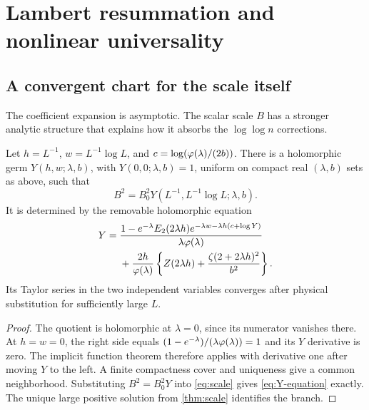 \section{Lambert resummation and nonlinear universality}
\label{sec:universality}

\subsection{A convergent chart for the scale itself}

The coefficient expansion is asymptotic. The scalar scale $B$ has a
stronger analytic structure that explains how it absorbs the
$\log\log n$ corrections.

\begin{proposition}
\label{prop:scale-chart}
Let $h=L^{-1}$, $w=L^{-1}\log L$, and
$c=\log(\varphi(\lambda)/(2b))$. There is a holomorphic germ
$Y(h,w;\lambda,b)$, with $Y(0,0;\lambda,b)=1$, uniform on compact
real $(\lambda,b)$ sets as above, such that
\begin{equation}\label{eq:Y-scale}
 B^2=B_0^2Y(L^{-1},L^{-1}\log L;\lambda,b).
\end{equation}
It is determined by the removable holomorphic equation
\begin{equation}\label{eq:Y-equation}
\begin{split}
 Y={}&\frac{1-e^{-\lambda}E_2(2\lambda h)
                e^{-\lambda w-\lambda h(c+\log Y)}}{
                \lambda\varphi(\lambda)}\\
 &+\frac{2h}{\varphi(\lambda)}
   \left\{Z(2\lambda h)+\frac{\zeta(2+2\lambda h)^2}{b^2}\right\}.
\end{split}
\end{equation}
Its Taylor series in the two independent variables converges after
physical substitution for sufficiently large $L$.
\end{proposition}

\begin{proof}
The quotient is holomorphic at $\lambda=0$, since its numerator
vanishes there. At $h=w=0$, the right side equals
$(1-e^{-\lambda})/(\lambda\varphi(\lambda))=1$ and its $Y$
derivative is zero. The implicit function theorem therefore applies
with derivative one after moving $Y$ to the left. A finite compactness
cover and uniqueness give a common neighborhood. Substituting
$B^2=B_0^2Y$ into \eqref{eq:scale} gives
\eqref{eq:Y-equation} exactly. The unique large positive solution
from \cref{thm:scale} identifies the branch.
\end{proof}

